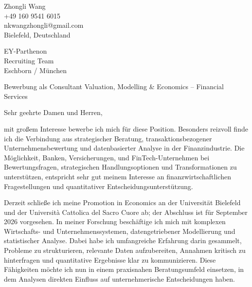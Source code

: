 \documentclass[11pt]{article}
\begin{document}
\begin{flushright}
Zhongli Wang \\
+49 160 9541 6015 \\
nkwangzhongli@gmail.com \\
Bielefeld, Deutschland \\
\end{flushright}

\vspace{0.1cm}

\noindent
EY-Parthenon \\
Recruiting Team \\
Eschborn / M\"unchen \\

\vspace{0.1cm}

\noindent
Bewerbung als Consultant Valuation, Modelling \& Economics -- Financial Services \\

\vspace{0.05cm}

\noindent Sehr geehrte Damen und Herren,

mit gro{\ss}em Interesse bewerbe ich mich f\"ur diese Position. Besonders reizvoll finde ich die Verbindung aus strategischer Beratung, transaktionsbezogener Unternehmensbewertung und datenbasierter Analyse in der Finanzindustrie. Die M\"oglichkeit, Banken, Versicherungen, und FinTech-Unternehmen bei Bewertungsfragen, strategischen Handlungsoptionen und Transformationen zu unterst\"utzen, entspricht sehr gut meinem Interesse an finanzwirtschaftlichen Fragestellungen und quantitativer Entscheidungsunterst\"utzung.

Derzeit schlie{\ss}e ich meine Promotion in Economics an der Universit\"at Bielefeld und der Universit\`a Cattolica del Sacro Cuore ab; der Abschluss ist f\"ur September 2026 vorgesehen. In meiner Forschung besch\"aftige ich mich mit komplexen Wirtschafts- und Unternehmenssystemen, datengetriebener Modellierung und statistischer Analyse. Dabei habe ich umfangreiche Erfahrung darin gesammelt, Probleme zu strukturieren, relevante Daten aufzubereiten, Annahmen kritisch zu hinterfragen und quantitative Ergebnisse klar zu kommunizieren. Diese F\"ahigkeiten m\"ochte ich nun in einem praxisnahen Beratungsumfeld einsetzen, in dem Analysen direkten Einfluss auf unternehmerische Entscheidungen haben.
\end{document}
